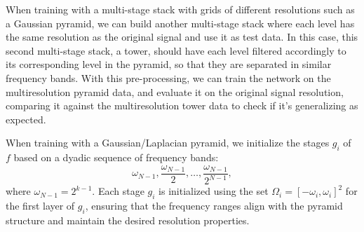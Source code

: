 When training with a multi-stage stack with grids of different resolutions such as a Gaussian pyramid, we can build another multi-stage stack where each level has the same resolution as the original signal and use it as test data. In this case, this second multi-stage stack, a tower, should have each level filtered accordingly to its corresponding level in the pyramid, so that they are separated in similar frequency bands. With this pre-processing, we can train the network on the multiresolution pyramid data, and evaluate it on the original signal resolution, comparing it against the multiresolution tower data to check if it's generalizing as expected.

When training with a Gaussian/Laplacian pyramid, we initialize the stages $g_i$ of $f$ based on a dyadic sequence of frequency bands:
\[
\omega_{N-1}, \frac{\omega_{N-1}}{2}, \ldots, \frac{\omega_{N-1}}{2^{N-1}},
\]
where $\omega_{N-1} = 2^{k-1}$. Each stage $g_i$ is initialized using the set $\Omega_i = \left[-\omega_i, \omega_i\right]^2$ for the first layer of $g_i$, ensuring that the frequency ranges align with the pyramid structure and maintain the desired resolution properties.






